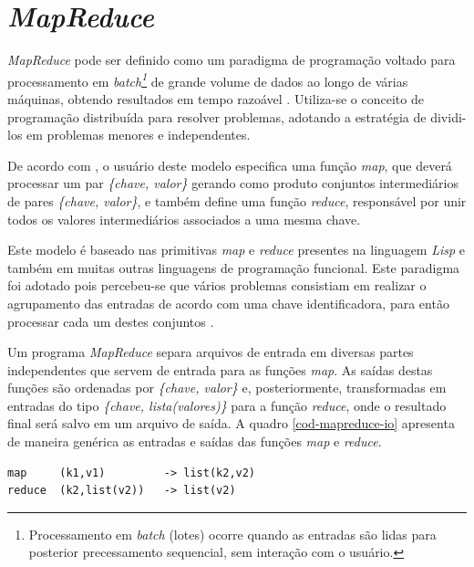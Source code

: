 \section{\textit{MapReduce}}

\textit{MapReduce} pode ser definido como um paradigma de programação voltado para processamento em \textit{batch\footnote{Processamento em \textit{batch} (lotes) ocorre quando as entradas são lidas para posterior precessamento sequencial, sem interação com o usuário.}} de grande volume de dados ao longo de várias máquinas, obtendo resultados em tempo razoável \cite{white2012}. Utiliza-se o conceito de programação distribuída para resolver problemas, adotando a estratégia de dividi-los em problemas menores e independentes.

De acordo com , o usuário deste modelo especifica uma função \textit{map}, que deverá processar um par \textit{\{chave, valor\}} gerando como produto conjuntos  intermediários de pares \textit{\{chave, valor\}}, e também define uma função \textit{reduce}, responsável por unir todos os valores intermediários associados a uma mesma chave.

Este modelo é baseado nas primitivas \textit{map} e \textit{reduce} presentes na linguagem \textit{Lisp} e também em muitas outras linguagens de programação funcional. Este paradigma foi adotado pois percebeu-se que vários problemas consistiam em realizar o agrupamento das entradas de acordo com uma chave identificadora, para então processar cada um destes conjuntos \cite{ghemawatMapreduce2008}.

Um programa \textit{MapReduce} separa arquivos de entrada em diversas partes independentes que servem de entrada para as funções \textit{map}. As saídas destas funções são ordenadas por \textit{\{chave, valor\}} e, posteriormente, transformadas em entradas do tipo \textit{\{chave, lista(valores)\}} para a função \textit{reduce}, onde o resultado final será salvo em um arquivo de saída. A quadro \ref{cod-mapreduce-io} apresenta de maneira genérica as entradas e saídas das funções \textit{map} e \textit{reduce}.

\begin{lstlisting}[style=abnt,frame=single, 
		caption={[Entradas e saídas - \textit{MapReduce}]Entradas e saídas - \textit{MapReduce}
		\protect\linebreak Fonte: \cite{ghemawatMapreduce2008}},
		label=cod-mapreduce-io]
map     (k1,v1)         -> list(k2,v2)
reduce  (k2,list(v2))   -> list(v2)
\end{lstlisting}
\FloatBarrier

